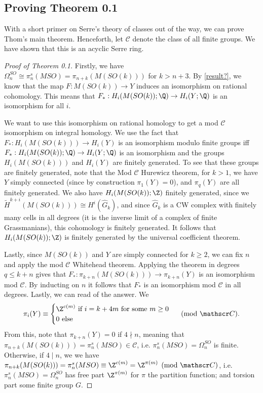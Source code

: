 \subsection{Proving Theorem 0.1}
With a short primer on Serre's theory of classes out of the way, we can prove Thom's main theorem. Henceforth, let $\mathscr C$ denote the class of all finite groups. We have shown that this is an acyclic Serre ring. 
\begin{proof}[Proof of Theorem 0.1]
Firstly, we have $\Omega_n^{SO}\cong \pi_n^s(MSO)=\pi_{n+k}(M(SO(k)))$ for $k>n+3$. By \cref{result?}, we know that the map $F:M(SO(k))\to Y$ induces an isomorphism on rational cohomology. This means that $F_*:H_i(M(SO(k));\Q)\to H_i(Y;\Q)$ is an isomorphism for all $i$. 

We want to use this isomorphism on rational homology to get a mod $\mathscr C$ isomorphism on integral homology. We use the fact that $F_*:H_i(M(SO(k)))\to H_i(Y)$ is an isomorphism modulo finite groups iff $F_*:H_i(M(SO(k));\Q)\to H_i(Y;\Q)$ is an isomorphism and the groups $H_i(M(SO(k)))$ and $ H_i(Y)$ are finitely generated. To see that these groups are finitely generated, note that the Mod $\mathscr C$ Hurewicz theorem, for $k>1$, we have $Y$ simply connected (since by construction $\pi_1(Y)=0$), and $\pi_q(Y)$ are all finitely generated. We also have $H_i(M(SO(k));\Z)$ finitely generated, since we $\widetilde H^{k+i}(M(SO(k)))\cong H^i(\widehat G_k)$, and since $\widehat G_k$ is a CW complex with finitely many cells in all degrees (it is the inverse limit of a complex of finite Grassmanians), this cohomology is finitely generated. It follows that $H_i(M(SO(k));\Z)$ is finitely generated by the universal coefficient theorem.

Lastly, since $M(SO(k))$ and $Y$ are simply connected for $k\geq 2$, we can fix $n$ and apply the mod $\mathscr C$ Whitehead theorem. Applying the theorem in degrees $q\leq k+n$ gives that $F_*:\pi_{k+n}(M(SO(k)))\to \pi_{k+n}(Y)$ is an isomorphism mod $\mathscr C$. By inducting on $n$ it follows that $F_*$ is an isomorphism mod $\mathscr C$ in all degrees. Lastly, we can read of the answer. We 
\[\pi_i(Y)\equiv \begin{cases}
    \Z^{c(m)}\text{ if }i=k+4m\text{ for some }m\geq 0\\
    0\text{ else }
\end{cases}\pmod{\mathscr C}.\]
From this, note that $\pi_{k+n}(Y)=0$ if $4\nmid n$, meaning that $\pi_{n+k}(M(SO(k)))=\pi_n^s(MSO)\in \mathscr C$, i.e. $\pi_n^s(MSO)=\Omega_n^{SO}$ is finite. Otherwise, if $4\mid n$, we we have $\pi_{n+k}(M(SO(k)))=\pi_n^s(MSO)\equiv \Z^{c(m)}=\Z^{\pi(m)} \pmod{\mathscr C}$, i.e. $\pi_n^s(MSO)=\Omega_n^{SO}$ has free part $\Z^{\pi(m)}$ for $\pi$ the partition function; and torsion part some finite group $G$.
\end{proof}
